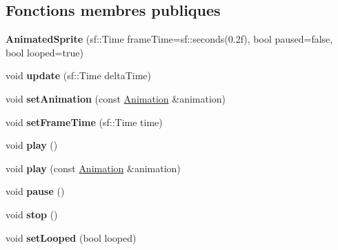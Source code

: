 \subsection*{Fonctions membres publiques}
\begin{DoxyCompactItemize}
\item 
\mbox{\label{class_animated_sprite_a097ab8444824e7085d71a1f7144e7763}} 
{\bfseries Animated\+Sprite} (sf\+::\+Time frame\+Time=sf\+::seconds(0.\+2f), bool paused=false, bool looped=true)
\item 
\mbox{\label{class_animated_sprite_a17a41ff812631a9d8947d272933d6696}} 
void {\bfseries update} (sf\+::\+Time delta\+Time)
\item 
\mbox{\label{class_animated_sprite_ab1afc57d90d57a0c4bc4f5b090f2dacf}} 
void {\bfseries set\+Animation} (const \hyperlink{class_animation}{Animation} \&animation)
\item 
\mbox{\label{class_animated_sprite_af598fab5c3599ccc5ed1e2d4fefa68cc}} 
void {\bfseries set\+Frame\+Time} (sf\+::\+Time time)
\item 
\mbox{\label{class_animated_sprite_a203b968f1cb374cca5dbc89716174020}} 
void {\bfseries play} ()
\item 
\mbox{\label{class_animated_sprite_a9ea345649a4e012d096bc04aafe1ecb0}} 
void {\bfseries play} (const \hyperlink{class_animation}{Animation} \&animation)
\item 
\mbox{\label{class_animated_sprite_a48384db59427423b5c1d98f6ee94fe45}} 
void {\bfseries pause} ()
\item 
\mbox{\label{class_animated_sprite_af9734f4346d3d2370322b2dcaeef133c}} 
void {\bfseries stop} ()
\item 
\mbox{\label{class_animated_sprite_a855a5a48ea2e1c51c7c9304857dd2f8c}} 
void {\bfseries set\+Looped} (bool looped)
\item 
\mbox{\label{class_animated_sprite_a1a96a0f6570efddd2eb26f89bc5b6f50}} 

\end{DoxyCompactItemize}
